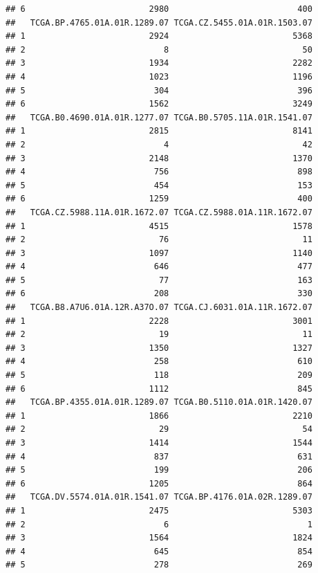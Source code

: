 \documentclass[
]{article}
\begin{document}
\begin{verbatim}
## 6                         2980                          400
##   TCGA.BP.4765.01A.01R.1289.07 TCGA.CZ.5455.01A.01R.1503.07
## 1                         2924                         5368
## 2                            8                           50
## 3                         1934                         2282
## 4                         1023                         1196
## 5                          304                          396
## 6                         1562                         3249
##   TCGA.B0.4690.01A.01R.1277.07 TCGA.B0.5705.11A.01R.1541.07
## 1                         2815                         8141
## 2                            4                           42
## 3                         2148                         1370
## 4                          756                          898
## 5                          454                          153
## 6                         1259                          400
##   TCGA.CZ.5988.11A.01R.1672.07 TCGA.CZ.5988.01A.11R.1672.07
## 1                         4515                         1578
## 2                           76                           11
## 3                         1097                         1140
## 4                          646                          477
## 5                           77                          163
## 6                          208                          330
##   TCGA.B8.A7U6.01A.12R.A37O.07 TCGA.CJ.6031.01A.11R.1672.07
## 1                         2228                         3001
## 2                           19                           11
## 3                         1350                         1327
## 4                          258                          610
## 5                          118                          209
## 6                         1112                          845
##   TCGA.BP.4355.01A.01R.1289.07 TCGA.B0.5110.01A.01R.1420.07
## 1                         1866                         2210
## 2                           29                           54
## 3                         1414                         1544
## 4                          837                          631
## 5                          199                          206
## 6                         1205                          864
##   TCGA.DV.5574.01A.01R.1541.07 TCGA.BP.4176.01A.02R.1289.07
## 1                         2475                         5303
## 2                            6                            1
## 3                         1564                         1824
## 4                          645                          854
## 5                          278                          269

\end{verbatim}
\end{document}
